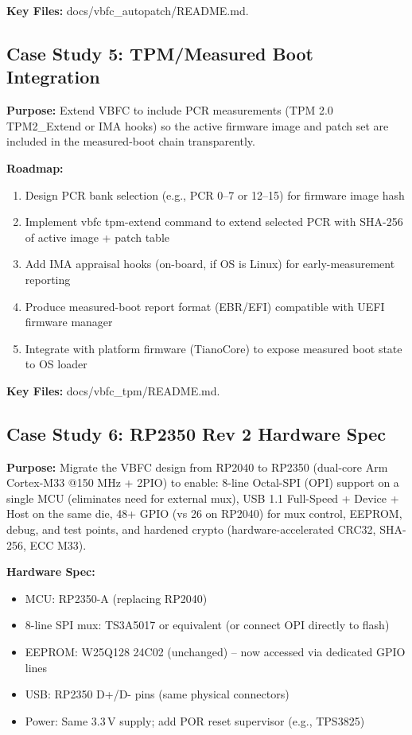 \documentclass[11pt,a4paper,oneside]{article}
\begin{document}
\textbf{Key Files:} docs/vbfc_autopatch/README.md.

\subsection{Case Study 5: TPM/Measured Boot Integration}
\textbf{Purpose:} Extend VBFC to include PCR measurements (TPM 2.0 TPM2_Extend or IMA hooks) so the active firmware image and patch set are included in the measured-boot chain transparently.

\textbf{Roadmap:}
\begin{enumerate}
  \item Design PCR bank selection (e.g., PCR 0--7 or 12--15) for firmware image hash
  \item Implement vbfc tpm-extend command to extend selected PCR with SHA-256 of active image + patch table
  \item Add IMA appraisal hooks (on-board, if OS is Linux) for early-measurement reporting
  \item Produce measured-boot report format (EBR/EFI) compatible with UEFI firmware manager
  \item Integrate with platform firmware (TianoCore) to expose measured boot state to OS loader
\end{enumerate}

\textbf{Key Files:} docs/vbfc_tpm/README.md.

\subsection{Case Study 6: RP2350 Rev 2 Hardware Spec}
\textbf{Purpose:} Migrate the VBFC design from RP2040 to RP2350 (dual-core Arm Cortex-M33 @150 MHz + 2\ac{PIO}) to enable: 8-line Octal-SPI (OPI) support on a single MCU (eliminates need for external mux), USB 1.1 Full-Speed + Device + Host on the same die, 48+ GPIO (vs 26 on RP2040) for mux control, EEPROM, debug, and test points, and hardened crypto (hardware-accelerated CRC32, SHA-256, ECC M33).

\textbf{Hardware Spec:}
\begin{itemize}
  \item MCU: RP2350-A (replacing RP2040)
  \item 8-line SPI mux: TS3A5017 or equivalent (or connect OPI directly to flash)
  \item EEPROM: W25Q128 24C02 (unchanged) -- now accessed via dedicated GPIO lines
  \item USB: RP2350 D+/D- pins (same physical connectors)
  \item Power: Same 3.3\,V supply; add POR reset supervisor (e.g., TPS3825)
\end{itemize}
\end{document}
